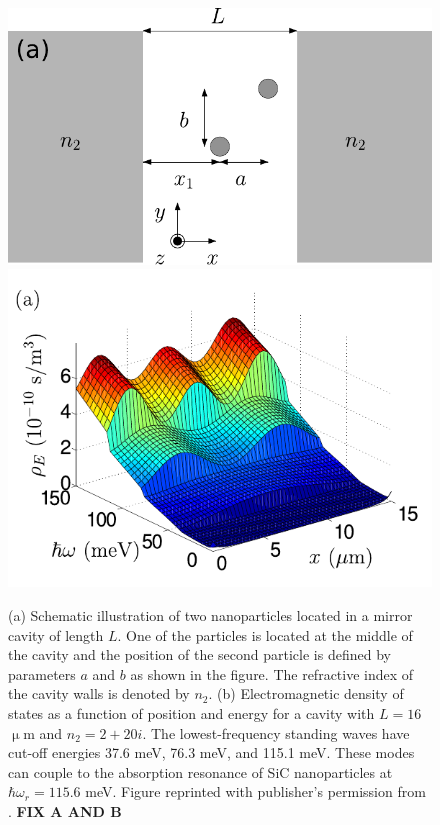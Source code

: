 \begin{figure}
 \includegraphics[width=.55\columnwidth]{pics/dipole_fig2.pdf}
 \includegraphics[width=.44\columnwidth]{pics/dipole_fig3a.pdf}
 \caption{(a) Schematic illustration of two nanoparticles located in a mirror cavity of length $L$. One of the particles is located at the middle of the cavity and the position of the second particle is defined by parameters $a$ and $b$ as shown in the figure. The refractive index of the cavity walls is denoted by $n_2$. (b) Electromagnetic density of states as a function of position and energy for a cavity with $L=16$ $\upmu$m and $n_2=2+20i$. The lowest-frequency standing waves have cut-off energies 37.6 meV, 76.3 meV, and 115.1 meV. These modes can couple to the absorption resonance of SiC nanoparticles at $\hbar\omega_r=115.6$ meV. Figure reprinted with publisher's permission from . \textbf{FIX A AND B}}
\label{fig:gfm_dipole_system}
\end{figure}



